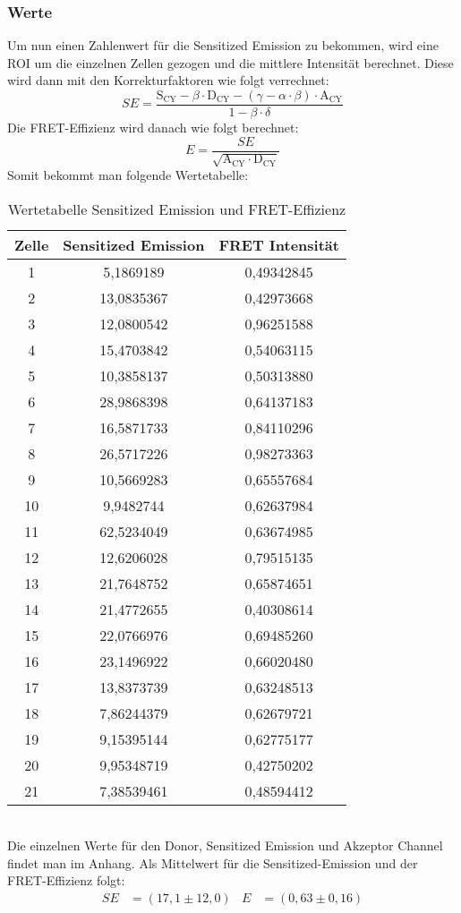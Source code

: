 \subsubsection{Werte}
Um nun einen Zahlenwert für die Sensitized Emission zu bekommen, wird eine ROI um die einzelnen Zellen gezogen und die mittlere Intensität berechnet.
Diese wird dann mit den Korrekturfaktoren wie folgt verrechnet:
\begin{equation}
    SE=\frac{\text{S}_\text{CY}-\beta\cdot\text{D}_\text{CY}-\left(\gamma-\alpha\cdot\beta\right)\cdot\text{A}_\text{CY}}{1-\beta\cdot\delta}
\end{equation}
Die FRET-Effizienz wird danach wie folgt berechnet:
\begin{equation}
    E=\frac{SE}{\sqrt{\text{A}_\text{CY}\cdot\text{D}_\text{CY}}}
\end{equation}\newpage
Somit bekommt man folgende Wertetabelle:
\begin{table}[htbp]
    \centering
      \begin{tabular}{c|cc}
        Zelle & Sensitized Emission & FRET Intensität\\\hline
      1 & 5,1869189 & 0,49342845 \\
      2 & 13,0835367 & 0,42973668 \\
      3 & 12,0800542 & 0,96251588 \\
      4 & 15,4703842 & 0,54063115 \\
      5 & 10,3858137 & 0,50313880 \\
      6 & 28,9868398 & 0,64137183 \\
      7 & 16,5871733 & 0,84110296 \\
      8 & 26,5717226 & 0,98273363 \\
      9 & 10,5669283 & 0,65557684 \\
      10 & 9,9482744 & 0,62637984 \\
      11 & 62,5234049 & 0,63674985 \\
      12 & 12,6206028 & 0,79515135 \\
      13 & 21,7648752 & 0,65874651 \\
      14 & 21,4772655 & 0,40308614 \\
      15 & 22,0766976 & 0,69485260 \\
      16 & 23,1496922 & 0,66020480 \\
      17 & 13,8373739 & 0,63248513 \\
      18 & 7,86244379 & 0,62679721 \\
      19 & 9,15395144 & 0,62775177 \\
      20 & 9,95348719 & 0,42750202 \\
      21 & 7,38539461 & 0,48594412 \\
      \end{tabular}
    \caption{Wertetabelle Sensitized Emission und FRET-Effizienz}
    \label{tab:SE Effizienz}
  \end{table}\\
  Die einzelnen Werte für den Donor, Sensitized Emission und Akzeptor Channel findet man im Anhang.
Als Mittelwert für die Sensitized-Emission und der FRET-Effizienz folgt:
\begin{align}
  SE&=\left(17,1\pm12,0\right) & E&=\left(0,63\pm0,16\right)
\end{align}\newpage
